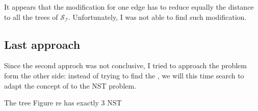 
It appears that the modification for one edge has to reduce equally
the distance to all the trees of
$\mathcal{S}_{\mathcal{I}}$. Unfortunately, I was not able to find
such modification.

\subsection{Last approach}

Since the second approch was not conclusive, I tried to approach the
problem form the other side: instead of trying to find the \widgets,
we will this time search to adapt the concept of \constraint to the
NST problem. 

The tree Figure re
has exactly 3 NST





